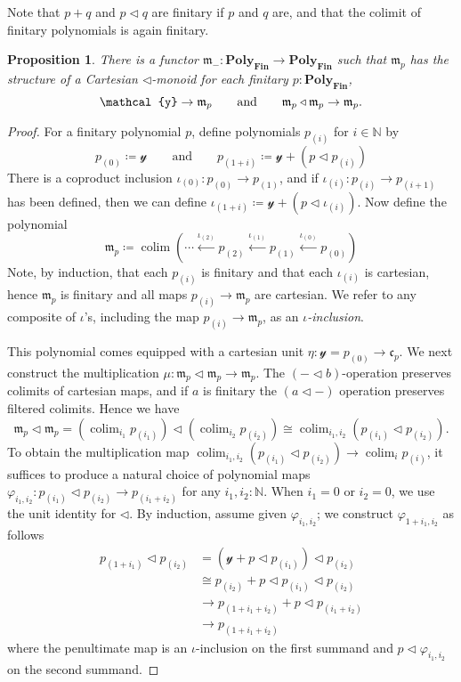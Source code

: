 \documentclass[11pt, one side, article]{memoir}
\theoremstyle{definition}
\theoremstyle{plain}
\newtheorem{proposition}[definitionx]{Proposition}
\DeclareMathOperator*{\colim}{colim}
\newcommand{\Cat}[1]{\mathbf{#1}}%
\newcommand{\From}[1]{\xleftarrow{#1}}
\newcommand{\nn}{\mathbb{N}}
\newcommand{\finset}{\Cat{Fin}}
\newcommand{\polyfin}{\poly_{\finset}}
\newcommand{\yon}{\mathcal{y}}
\newcommand{\poly}{\Cat{Poly}}
\newcommand{\tri}{\mathbin{\triangleleft}}
\newcommand{\free}{\mathfrak{m}}
\newcommand{\cofree}{\mathfrak{c}}
\newcommand{\qqand}{\qquad\text{and}\qquad}
\newcommand{\hoc}[1]{_{(#1)}}
\begin{document}
Note that $p+q$ and $p\tri q$ are finitary if $p$ and $q$ are, and that the colimit of finitary polynomials is again finitary.


\begin{proposition}
There is a functor $\free_-\colon\polyfin\to\polyfin$ such that $\free_p$ has the structure of a Cartesian $\tri$-monoid for each finitary $p:\polyfin$,
\[
\yon\to\free_p
\qqand
\free_p\tri\free_p\to\free_p.
\qedhere
\]
\end{proposition}
\begin{proof}
For a finitary polynomial $p$, define polynomials $p\hoc{i}$ for $i\in\nn$ by
\[
p\hoc{0}\coloneqq\yon
\qqand
p\hoc{1+i}\coloneqq\yon+\left(p\tri p\hoc{i}\right)
\]
There is a coproduct inclusion $\iota\hoc{0}\colon p\hoc{0}\to p\hoc{1}$, and if $\iota\hoc{i}\colon p\hoc{i}\to p\hoc{i+1}$ has been defined, then we can define $\iota\hoc{1+i}\coloneqq \yon+(p\tri\iota\hoc{i})$. Now define the polynomial
\begin{equation}
	\free_p\coloneqq\colim\left(\cdots\From{\iota\hoc{2}}p\hoc{2}\From{\iota\hoc{1}}p\hoc{1}\From{\iota\hoc{0}}p\hoc{0}\right)
\end{equation}
Note, by induction, that each $p\hoc{i}$ is finitary and that each $\iota\hoc{i}$ is cartesian, hence $\free_p$ is finitary and all maps $p\hoc{i}\to\free_p$ are cartesian. We refer to any composite of $\iota$'s, including the map $p\hoc{i}\to\free_p$, as an \emph{$\iota$-inclusion}.

This polynomial comes equipped with a cartesian unit $\eta\colon\yon=p\hoc{0}\to\cofree_p$. We next construct the multiplication $\mu\colon\free_p\tri\free_p\to\free_p$. The $(-\tri b)$-operation preserves colimits of cartesian maps, and if $a$ is finitary the $(a\tri-)$ operation preserves filtered colimits. Hence we have
\[
	\free_p\tri\free_p=
  \left(\colim_{i_1}p\hoc{i_1}\right)\tri\left(\colim_{i_2}p\hoc{i_2}\right)\cong
  \colim_{i_1,i_2}\left(p\hoc{i_1}\tri p\hoc{i_2}\right).
\]
To obtain the multiplication map $\colim_{i_1,i_2}(p\hoc{i_1}\tri p\hoc{i_2})\to\colim_i p\hoc{i}$, it suffices to produce a natural choice of polynomial maps $\varphi_{i_1,i_2}\colon p\hoc{i_1}\tri p\hoc{i_2}\to p\hoc{i_1+i_2}$ for any $i_1,i_2:\nn$. When $i_1=0$ or $i_2=0$, we use the unit identity for $\tri$. By induction, assume given $\varphi_{i_1,i_2}$; we construct $\varphi_{1+i_1,i_2}$ as follows
\begin{align*}
	p\hoc{1+i_1}\tri p\hoc{i_2}&=
	\left(\yon+p\tri p\hoc{i_1}\right)\tri p\hoc{i_2}\\&\cong
	p\hoc{i_2}+p\tri p\hoc{i_1}\tri p\hoc{i_2}\\&\to
	p\hoc{1+i_1+i_2}+p\tri p\hoc{i_1+i_2}\\&\to
	p\hoc{1+i_1+i_2}
\end{align*}
where the penultimate map is an $\iota$-inclusion on the first summand and $p\tri\varphi_{i_1,i_2}$ on the second summand.


\end{proof}
\end{document}
